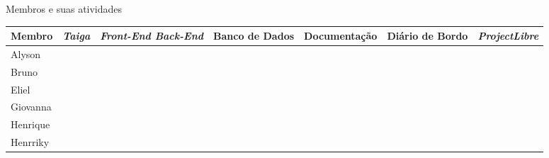 \begin{quadro}[h]
	\setlength{\tabcolsep}{2pt}
	\begin{center}
		\caption{\label{quad:membros-atividades}Membros e suas atividades}
		\begin{tabular}{|l|c|m{2.5cm}|m{2cm}|c|m{2cm}|c|}
			\hline
			\textbf{Membro} & \textbf{\emph{Taiga}} & \centering\textbf{\textit{Front-End Back-End}} & \centering\textbf{Banco de Dados} & \textbf{Documentação} & \centering\textbf{Diário de Bordo} & \textbf{\emph{ProjectLibre}}\\
			\hline
			Alyson & \checkmark & \centering\checkmark & \centering\checkmark & \checkmark & \centering\checkmark & \checkmark \\
			\hline
			Bruno & \checkmark & \centering\checkmark & \centering\checkmark & \checkmark & & \checkmark\\
			\hline
			Eliel & \checkmark & \centering\checkmark & \centering\checkmark & \checkmark & & \checkmark\\
			\hline
			Giovanna & \checkmark &  & \centering\checkmark & \checkmark & \centering\checkmark & \checkmark\\
			\hline
			Henrique & \checkmark & \centering\checkmark & \centering\checkmark & \checkmark & & \\
			\hline
			Henrriky & \checkmark & \centering\checkmark & \centering\checkmark & \checkmark & & \\
			\hline
		\end{tabular}
	\end{center}
\end{quadro}